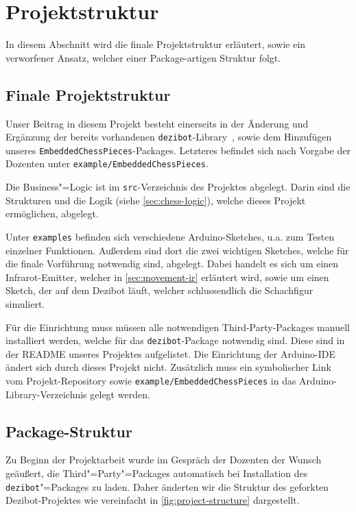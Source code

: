 
\section{Projektstruktur}

In diesem Abschnitt wird die finale Projektstruktur erläutert, sowie ein verworfener Ansatz, welcher einer Package-artigen Struktur folgt.


\subsection{Finale Projektstruktur}
\label{sec:final-project-structure}

Unser Beitrag in diesem Projekt besteht einerseits in der Änderung und Ergänzung der bereits vorhandenen \texttt{dezibot}-Library~\cite{dezibotteamDezibotDezibot2025}, sowie dem Hinzufügen unseres \texttt{EmbeddedChessPieces}-Packages. Letzteres befindet sich nach Vorgabe der Dozenten unter \texttt{example/EmbeddedChessPieces}.

Die Business"=Logic ist im \texttt{src}-Verzeichnis des Projektes abgelegt. Darin sind die Strukturen und die Logik (siehe \autoref{sec:chess-logic}), welche dieses Projekt ermöglichen, abgelegt.

Unter \texttt{examples} befinden sich verschiedene Arduino-Sketches, u.a. zum Testen einzelner Funktionen. Außerdem sind dort die zwei wichtigen Sketches, welche für die finale Vorführung notwendig sind, abgelegt. Dabei handelt es sich um einen Infrarot-Emitter, welcher in \autoref{sec:movement-ir} erläutert wird, sowie um einen Sketch, der auf dem Dezibot läuft, welcher schlussendlich die Schachfigur simuliert.

Für die Einrichtung muss müssen alle notwendigen Third-Party-Packages manuell installiert werden, welche für das \texttt{dezibot}-Package notwendig sind. Diese sind in der README unseres Projektes aufgelistet. Die Einrichtung der Arduino-IDE ändert sich durch dieses Projekt nicht. Zusätzlich muss ein symbolischer Link vom Projekt-Repository sowie \texttt{example/EmbeddedChessPieces} in das Arduino-Library-Verzeichnis gelegt werden.


\subsection{Package-Struktur}

Zu Beginn der Projektarbeit wurde im Gespräch der Dozenten der Wunsch geäußert, die Third"=Party"=Packages automatisch bei Installation des \texttt{dezibot}"=Packages zu laden. Daher änderten wir die Struktur des geforkten Dezibot-Projektes wie vereinfacht in \autoref{fig:project-structure} dargestellt.

